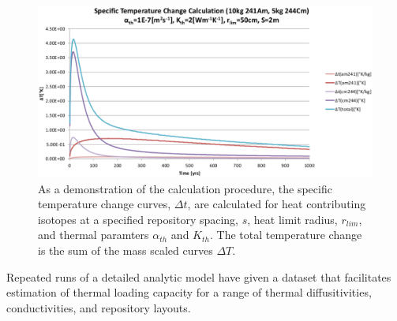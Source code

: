 \begin{figure}[htp!]
\begin{center}
\includegraphics[width=0.8\columnwidth]{images/fakeArbitraryWF.eps}
\end{center}
\caption{\footnotesize{As a demonstration of the calculation procedure, the specific 
temperature change curves, $\Delta t$, are calculated for heat contributing 
isotopes at a 
specified repository spacing, $s$, heat limit radius, $r_{lim}$, and thermal paramters 
$\alpha_{th}$ and $K_{th}$. The total temperature change is the sum of the 
mass scaled curves $\Delta T$.}}
\label{fig:fakeArbitraryWF}
\end{figure}

Repeated runs of a detailed analytic model have given a dataset that 
facilitates estimation of thermal loading capacity for a range of thermal 
diffusitivities, conductivities, and repository layouts.




